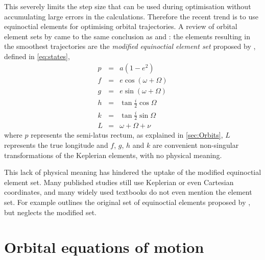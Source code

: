 This severely limits the step size that can be used during optimisation without accumulating large errors in the calculations. Therefore the recent trend is to use equinoctial elements for optimising orbital trajectories. A review of orbital element sets by \textcite{Hintz2008} came to the same conclusion as \citeauthor{Letterio_thesis} and \citeauthor{Keppeler_thesis}: the elements resulting in the smoothest trajectories are the \emph{modified equinoctial element set} proposed by \textcite{Walker1985}, defined in \eqref{eq:states},
\begin{subequations}\label{eq:states}
\begin{eqnarray}
p & = & a(1-e^{2}) \label{eq:p}\\
f & = & e\cos(\omega+\Omega) \label{eq:f}\\
g & = & e\sin(\omega+\Omega) \label{eq:g}\\
h & = & \tan\frac{i}{2}\cos\Omega \label{eq:h}\\
k & = & \tan\frac{i}{2}\sin\Omega \label{eq:k}\\
L & = & \omega+\Omega+\nu \label{eq:L}
\end{eqnarray}
\end{subequations}
where $p$ represents the semi-latus rectum, as explained in \autoref{sec:Orbits}, $L$ represents the true longitude and $f$, $g$, $h$ and $k$ are convenient non-singular transformations of the Keplerian elements, with no physical meaning.

This lack of physical meaning has hindered the uptake of the modified equinoctial element set. Many published studies still use Keplerian or even Cartesian coordinates, and many widely used textbooks do not even mention the element set. For example \textcite[][p. 194]{Chobotov2002} outlines the original set of equinoctial elements proposed by \textcite{Broucke1972}, but neglects the modified set.





\section{Orbital equations of motion} \label{sec:Orbital-equations-of-motion}

